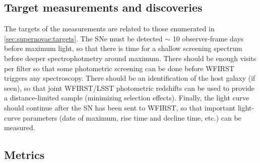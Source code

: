 
\subsection{Target measurements and discoveries}
\label{sec:\secname:targets}

%


The targets of the measurements are related to those enumerated in
\autoref{sec:supernovae:targets}. The SNe must be detected $\sim$ 10
observer-frame days before maximum light, so that there is time for a
shallow screening spectrum before deeper spectrophotmetry around
maximum. There should be enough visits per filter so that some
photometric screening can be done before WFIRST triggers any
spectroscopy. There should be an identification of the host galaxy (if
seen), so that joint WFIRST/LSST photometric redshifts can be used to
provide a distance-limited sample (minimizing selection effects).
Finally, the light curve should continue after the SN has been sent to
WFIRST, so that important light-curve parameters (date of maximum, rise
time and decline time, etc.) can be measured.




\subsection{Metrics}
\label{sec:\secname:metrics}

